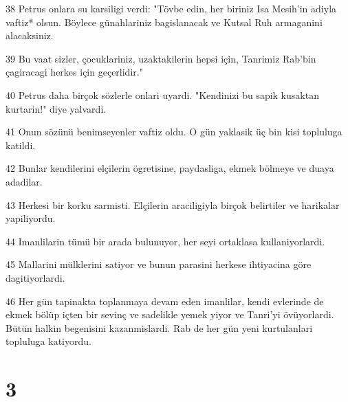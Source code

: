 \par 38 Petrus onlara su karsiligi verdi: "Tövbe edin, her biriniz Isa Mesih'in adiyla vaftiz* olsun. Böylece günahlariniz bagislanacak ve Kutsal Ruh armaganini alacaksiniz.
\par 39 Bu vaat sizler, çocuklariniz, uzaktakilerin hepsi için, Tanrimiz Rab'bin çagiracagi herkes için geçerlidir."
\par 40 Petrus daha birçok sözlerle onlari uyardi. "Kendinizi bu sapik kusaktan kurtarin!" diye yalvardi.
\par 41 Onun sözünü benimseyenler vaftiz oldu. O gün yaklasik üç bin kisi topluluga katildi.
\par 42 Bunlar kendilerini elçilerin ögretisine, paydasliga, ekmek bölmeye ve duaya adadilar.
\par 43 Herkesi bir korku sarmisti. Elçilerin araciligiyla birçok belirtiler ve harikalar yapiliyordu.
\par 44 Imanlilarin tümü bir arada bulunuyor, her seyi ortaklasa kullaniyorlardi.
\par 45 Mallarini mülklerini satiyor ve bunun parasini herkese ihtiyacina göre dagitiyorlardi.
\par 46 Her gün tapinakta toplanmaya devam eden imanlilar, kendi evlerinde de ekmek bölüp içten bir sevinç ve sadelikle yemek yiyor ve Tanri'yi övüyorlardi. Bütün halkin begenisini kazanmislardi. Rab de her gün yeni kurtulanlari topluluga katiyordu.

\chapter{3}

